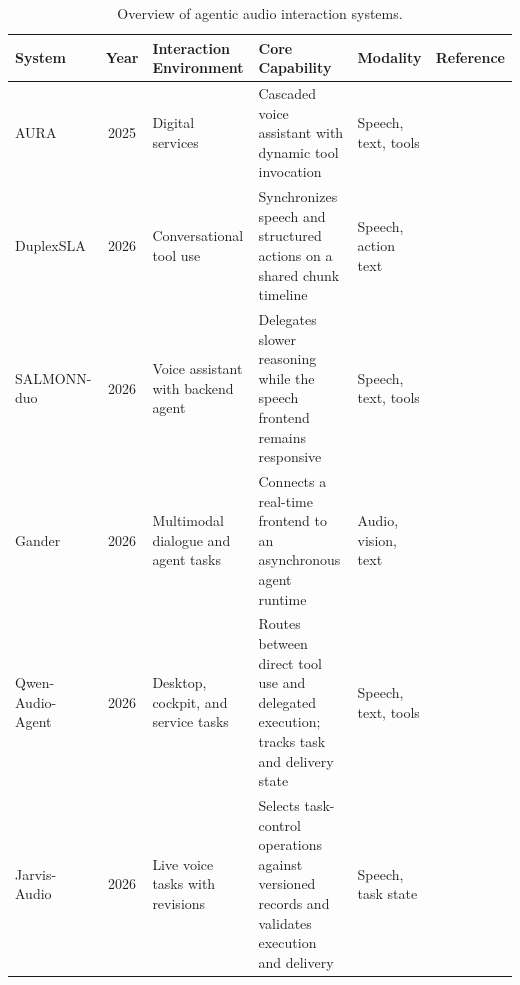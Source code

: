 \begin{table}[t]
    \centering
    \caption{Overview of agentic audio interaction systems.}
    \label{tab:agentic-systems}
    \footnotesize
    \setlength{\tabcolsep}{4pt}
    \renewcommand{\arraystretch}{1.12}
    \begin{tabularx}{\textwidth}{@{}>{\raggedright\arraybackslash}p{}c>{\raggedright\arraybackslash}p{}>{\raggedright\arraybackslash}X>{\raggedright\arraybackslash}p{}l@{}}
        \toprule
        System & Year & Interaction Environment & Core Capability & Modality & Reference \\
        \midrule
        AURA & 2025 & Digital services & Cascaded voice assistant with dynamic tool invocation & Speech, text, tools & \citep{DBLP:journals/corr/abs-2506-23049} \\
        DuplexSLA & 2026 & Conversational tool use & Synchronizes speech and structured actions on a shared chunk timeline & Speech, action text & \citep{DBLP:journals/corr/abs-2605-20755} \\
        \addlinespace
        SALMONN-duo & 2026 & Voice assistant with backend agent & Delegates slower reasoning while the speech frontend remains responsive & Speech, text, tools & \citep{DBLP:journals/corr/abs-2609-34247} \\
        Gander & 2026 & Multimodal dialogue and agent tasks & Connects a real-time frontend to an asynchronous agent runtime & Audio, vision, text & \citep{DBLP:journals/corr/abs-2609-08977} \\
        Qwen-Audio-Agent & 2026 & Desktop, cockpit, and service tasks & Routes between direct tool use and delegated execution; tracks task and delivery state & Speech, text, tools & \citep{DBLP:journals/corr/abs-2609-25195} \\
        Jarvis-Audio & 2026 & Live voice tasks with revisions & Selects task-control operations against versioned records and validates execution and delivery & Speech, task state & \citep{WEB:arxiv/2610.23804} \\

\end{tabularx}
\end{table}
